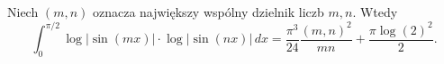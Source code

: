 %

\begin{problem}[pytanie 2826571]
    \label{stack_2826571}%
    Niech $(m, n)$ oznacza największy wspólny dzielnik liczb $m, n$.
    Wtedy
    \begin{equation}
        \int_0^{\pi/2} \log \lvert \sin(mx) \rvert \cdot \log \lvert\sin(nx)\rvert \, dx = \frac{\pi^3}{24} \frac{(m,n)^2}{mn}+\frac{\pi\log (2)^2}{2}.
    \end{equation}
\end{problem}

%